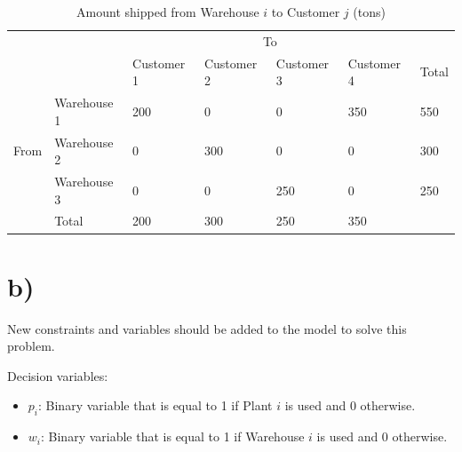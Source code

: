 \documentclass{article}
\begin{document}
\begin{table}[ht]
    \caption{Amount shipped from Warehouse $i$ to Customer $j$ (tons)}
    \begin{tabular}{ll|lllll}
    \cline{3-6}
                               &             & \multicolumn{4}{c|}{To}                                                                                                                                            \\ \cline{2-7} 
    \multicolumn{1}{l|}{}      &             & \multicolumn{1}{l|}{Customer 1} & \multicolumn{1}{l|}{Customer 2} & \multicolumn{1}{l|}{Customer 3} & \multicolumn{1}{l|}{Customer 4} & \multicolumn{1}{l|}{Total} \\ \hline
    \multicolumn{1}{|l|}{}     & Warehouse 1 & \multicolumn{1}{l|}{200}        & \multicolumn{1}{l|}{0}          & \multicolumn{1}{l|}{0}          & \multicolumn{1}{l|}{350}        & \multicolumn{1}{l|}{550}   \\ \cline{2-7} 
    \multicolumn{1}{|l|}{From} & Warehouse 2 & \multicolumn{1}{l|}{0}          & \multicolumn{1}{l|}{300}        & \multicolumn{1}{l|}{0}          & \multicolumn{1}{l|}{0}          & \multicolumn{1}{l|}{300}   \\ \cline{2-7} 
    \multicolumn{1}{|l|}{}     & Warehouse 3 & \multicolumn{1}{l|}{0}          & \multicolumn{1}{l|}{0}          & \multicolumn{1}{l|}{250}        & \multicolumn{1}{l|}{0}          & \multicolumn{1}{l|}{250}   \\ \hline
    \multicolumn{1}{l|}{}      & Total       & \multicolumn{1}{l|}{200}        & \multicolumn{1}{l|}{300}        & \multicolumn{1}{l|}{250}        & \multicolumn{1}{l|}{350}        &                            \\ \cline{2-6}
    \end{tabular}
\end{table}


\section*{b)}
New constraints and variables should be added to the model to solve this problem.

Decision variables:
\begin{itemize}
    \item $p_{i}$: Binary variable that is equal to 1 if Plant $i$ is used and 0 otherwise. 
    \item $w_{i}$: Binary variable that is equal to 1 if Warehouse $i$ is used and 0 otherwise.
\end{itemize}
\end{document}
